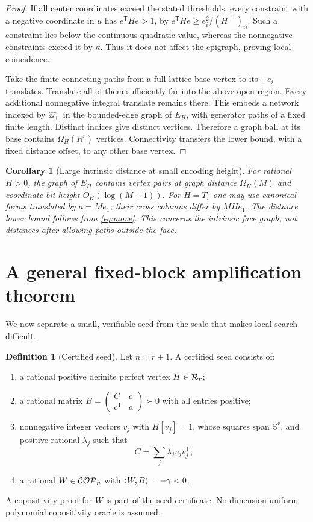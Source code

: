 \documentclass[11pt]{article}
\newtheorem{corollary}[theorem]{Corollary}
\theoremstyle{definition}\newtheorem{definition}[theorem]{Definition}
\theoremstyle{remark}\newtheorem{remark}[theorem]{Remark}
\newcommand{\T}{^{\mathsf T}}\newcommand{\norm}[1]{\lVert #1\rVert}
\begin{document}
\begin{proof}
If all center coordinates exceed the stated thresholds, every constraint with a negative coordinate in $u$ has $e\T He>1$, by
$e\T He\ge e_i^2/(H^{-1})_{ii}$. Such a constraint lies below the continuous quadratic value, whereas the nonnegative constraints exceed it by $\kappa$. Thus it does not affect the epigraph, proving local coincidence.

Take the finite connecting paths from a full-lattice base vertex to its $+e_i$ translates. Translate all of them sufficiently far into the above open region. Every additional nonnegative integral translate remains there. This embeds a network indexed by $\mathbb Z_+^r$ in the bounded-edge graph of $E_H$, with generator paths of a fixed finite length. Distinct indices give distinct vertices. Therefore a graph ball at its base contains $\Omega_H(R^r)$ vertices. Connectivity transfers the lower bound, with a fixed distance offset, to any other base vertex.
\end{proof}

\begin{corollary}[Large intrinsic distance at small encoding height]
For rational $H>0$, the graph of $E_H$ contains vertex pairs at graph distance $\Omega_H(M)$ and coordinate bit height $O_H(\log(M+1))$. For $H=T_r$ one may use canonical forms translated by $a=Me_1$; their cross columns differ by $MH e_1$. The distance lower bound follows from \eqref{eq:move}. This concerns the intrinsic face graph, not distances after allowing paths outside the face.
\end{corollary}

\section{A general fixed-block amplification theorem}
We now separate a small, verifiable seed from the scale that makes local search difficult.

\begin{definition}[Certified seed]\label{def:seed}
Let $n=r+1$. A certified seed consists of:
\begin{enumerate}
\item a rational positive definite perfect vertex $H\in\mathcal R_r$;
\item a rational matrix $B=\left(\begin{smallmatrix}C&c\\c\T&a\end{smallmatrix}\right)\succ0$ with all entries positive;
\item nonnegative integer vectors $v_j$ with $H[v_j]=1$, whose squares span $\mathbb S^r$, and positive rational $\lambda_j$ such that
\begin{equation}\label{eq:reserve} C=\sum_j\lambda_jv_jv_j\T;\end{equation}
\item a rational $W\in\mathcal{COP}_n$ with $\langle W,B\rangle=-\gamma<0$.
\end{enumerate}
A copositivity proof for $W$ is part of the seed certificate. No dimension-uniform polynomial copositivity oracle is assumed.
\end{definition}
\end{document}
